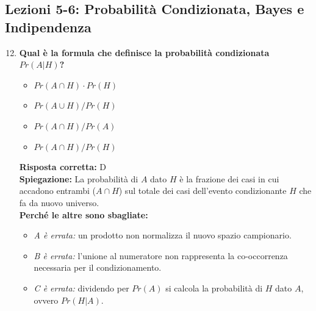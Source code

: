 \documentclass[12pt, a4paper]{article}
\begin{document}
\subsection*{Lezioni 5-6: Probabilità Condizionata, Bayes e Indipendenza}

\begin{enumerate}[label=\textbf{\arabic*.}]
\setcounter{enumi}{11}
    \item \textbf{Qual è la formula che definisce la probabilità condizionata $Pr(A | H)$?}
    \begin{itemize}
        \item[A)] $Pr(A \cap H) \cdot Pr(H)$
        \item[B)] $Pr(A \cup H) / Pr(H)$
        \item[C)] $Pr(A \cap H) / Pr(A)$
        \item[D)] $Pr(A \cap H) / Pr(H)$
    \end{itemize}
    \textbf{Risposta corretta:} D \\
    \textbf{Spiegazione:} La probabilità di $A$ dato $H$ è la frazione dei casi in cui accadono entrambi ($A \cap H$) sul totale dei casi dell'evento condizionante $H$ che fa da nuovo universo. \\
    \textbf{Perché le altre sono sbagliate:}
    \begin{itemize}
        \item \textit{A è errata:} un prodotto non normalizza il nuovo spazio campionario.
        \item \textit{B è errata:} l'unione al numeratore non rappresenta la co-occorrenza necessaria per il condizionamento.
        \item \textit{C è errata:} dividendo per $Pr(A)$ si calcola la probabilità di $H$ dato $A$, ovvero $Pr(H | A)$.
    \end{itemize}


\end{enumerate}
\end{document}
